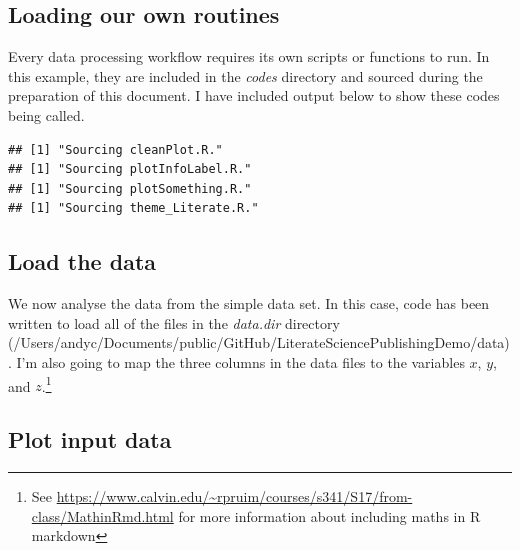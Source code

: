 \documentclass[11pt,]{article}
\newenvironment{Shaded}{\begin{snugshade}}{\end{snugshade}}
\newcommand{\CharTok}[1]{\textcolor[rgb]{0.31,0.60,0.02}{#1}}
\newcommand{\CommentTok}[1]{\textcolor[rgb]{0.56,0.35,0.01}{\textit{#1}}}
\newcommand{\ControlFlowTok}[1]{\textcolor[rgb]{0.13,0.29,0.53}{\textbf{#1}}}
\newcommand{\DataTypeTok}[1]{\textcolor[rgb]{0.13,0.29,0.53}{#1}}
\newcommand{\KeywordTok}[1]{\textcolor[rgb]{0.13,0.29,0.53}{\textbf{#1}}}
\newcommand{\NormalTok}[1]{#1}
\newcommand{\StringTok}[1]{\textcolor[rgb]{0.31,0.60,0.02}{#1}}
\let\rmarkdownfootnote\footnote%
\def\footnote{\protect\rmarkdownfootnote}
\begin{document}
\hypertarget{loading-our-own-routines}{%
\subsection{Loading our own routines}\label{loading-our-own-routines}}

Every data processing workflow requires its own scripts or functions to run. In this example, they are included in the \emph{codes} directory and sourced during the preparation of this document. I have included output below to show these codes being called.

\begin{Shaded}
\end{Shaded}

\begin{verbatim}
## [1] "Sourcing cleanPlot.R."
## [1] "Sourcing plotInfoLabel.R."
## [1] "Sourcing plotSomething.R."
## [1] "Sourcing theme_Literate.R."
\end{verbatim}

\hypertarget{load-the-data}{%
\subsection{Load the data}\label{load-the-data}}

We now analyse the data from the simple data set. In this case, code has been written to load all of the files in the \emph{data.dir} directory (/Users/andyc/Documents/public/GitHub/LiterateSciencePublishingDemo/data). I'm also going to map the three columns in the data files to the variables \(x\), \(y\), and \(z\).\footnote{See \url{https://www.calvin.edu/~rpruim/courses/s341/S17/from-class/MathinRmd.html} for more information about including maths in R markdown}

\hypertarget{plot-input-data}{%
\subsection{Plot input data}\label{plot-input-data}}
\end{document}
